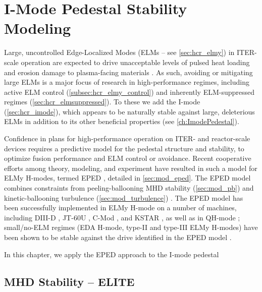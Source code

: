 \chapter{I-Mode Pedestal Stability Modeling}\label{ch:ImodeModeling}

Large, uncontrolled Edge-Localized Modes (ELMs -- see \cref{sec:hcr_elmy}) in ITER-scale operation are expected to drive unacceptable levels of pulsed heat loading and erosion damage to plasma-facing materials \cite{Loarte2003,Federici2003}.  As such, avoiding or mitigating large ELMs is a major focus of research in high-performance regimes, including active ELM control (\cref{subsec:hcr_elmy_control}) and inherently ELM-suppressed regimes (\cref{sec:hcr_elmsuppressed}).  To these we add the I-mode (\cref{sec:hcr_imode}), which appears to be naturally stable against large, deleterious ELMs in addition to its other beneficial properties (see \cref{ch:ImodePedestal}).

Confidence in plans for high-performance operation on ITER- and reactor-scale devices requires a predictive model for the pedestal structure and stability, to optimize fusion performance and ELM control or avoidance.  Recent cooperative efforts among theory, modeling, and experiment \cite{Groebner2013} have resulted in such a model for ELMy H-modes, termed EPED \cite{Snyder2009,Snyder2011}, detailed in \cref{sec:mod_eped}.  The EPED model combines constraints from peeling-ballooning MHD stability (\cref{sec:mod_pb}) \cite{Wilson2002,Snyder2004,Wilson2006} and kinetic-ballooning turbulence (\cref{sec:mod_turbulence}) \cite{Snyder1999,Candy2005,Snyder2001}.  The EPED model has been successfully implemented in ELMy H-mode on a number of machines, including DIII-D \cite{Snyder2009,Snyder2011}, JT-60U \cite{Snyder2009}, C-Mod \cite{Walk2012}, and KSTAR \cite{Han2013}, as well as in QH-mode \cite{Snyder2012}; small/no-ELM regimes (EDA H-mode, type-II and type-III ELMy H-modes) have been shown to be stable against the drive identified in the EPED model \cite{Snyder2009}.

In this chapter, we apply the EPED approach to the I-mode pedestal \cite{Walk2014}

\section{MHD Stability -- ELITE}\label{sec:imode_elite}


